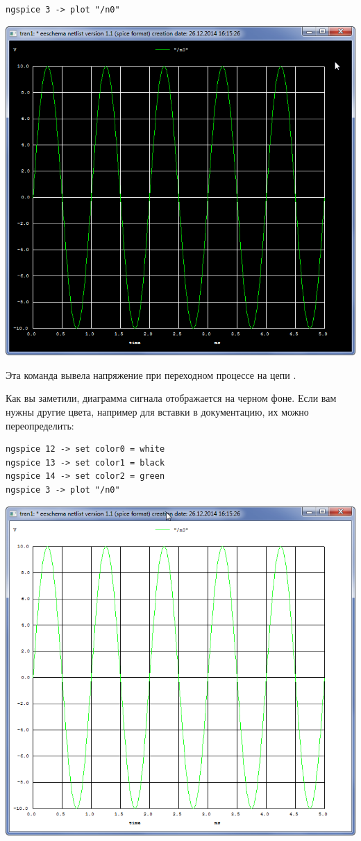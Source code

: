 \begin{verbatim}
ngspice 3 -> plot "/n0"
\end{verbatim}

\clearpage
\noindent\includegraphics[height=\textheight]{spice/spice1.png}
\clearpage

Эта команда вывела напряжение при переходном процессе на цепи .

Как вы заметили, диаграмма сигнала отображается на черном фоне. Если вам нужны
другие цвета, например для вставки в документацию, их можно переопределить:

\begin{verbatim}
ngspice 12 -> set color0 = white
ngspice 13 -> set color1 = black
ngspice 14 -> set color2 = green
ngspice 3 -> plot "/n0"
\end{verbatim}
 
\noindent\includegraphics[height=0.5\textheight]{spice/spice2.png}

